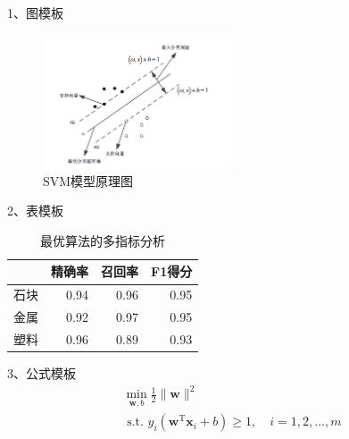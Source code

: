 \documentclass{article}
\begin{document}
\begin{appendices}
    1、图模板
    \begin{figure}[htpb]
        \centering
        \includegraphics[width=0.5\textwidth]{svm.png}
        \caption{SVM模型原理图}
        \label{fig:svm}
    \end{figure}

    2、表模板
    \begin{table}[htpb]
        \caption{最优算法的多指标分析}
        \begin{center}\label{table:score}
            \begin{tabular}{|c|r|r|r|}
                \hline
                     & \multicolumn{1}{c|}{精确率} & \multicolumn{1}{c|}{召回率} & \multicolumn{1}{c|}{F1得分} \\ \hline
                石块 & 0.94                        & 0.96                        & 0.95                        \\ \hline
                金属 & 0.92                        & 0.97                        & 0.95                        \\ \hline
                塑料 & 0.96                        & 0.89                        & 0.93                        \\ \hline
            \end{tabular}
        \end{center}
    \end{table}

    3、公式模板
    \begin{equation}\label{eq:svmsuper}
        \begin{array}{l}
            \min _{\boldsymbol{w}, b} \frac{1}{2}\|\boldsymbol{w}\|^{2} \\
            \text { s.t. } y_{i}\left(\boldsymbol{w}^{\mathrm{T}} \boldsymbol{x}_{i}+b\right) \geqslant 1, \quad i=1,2, \ldots, m
        \end{array}
    \end{equation}



\end{appendices}
\end{document}
